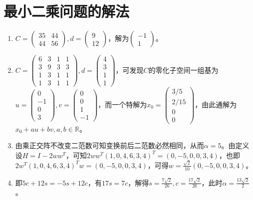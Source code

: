 \documentclass[a4paper,UTF8,fontset=windows]{ctexart}
\begin{document}
\section{最小二乘问题的解法}
\begin{enumerate}
\item
$C=\begin{pmatrix}35&44\\44&56\end{pmatrix},d=\begin{pmatrix}9\\12\end{pmatrix}$，解为$\begin{pmatrix}-1\\1\end{pmatrix}$。

\item
$C=\begin{pmatrix}6&3&1&1\\3&9&3&3\\1&3&1&1\\1&3&1&1\end{pmatrix},d=\begin{pmatrix}4\\3\\1\\1\end{pmatrix}$，可发现$C$的零化子空间一组基为$u=\begin{pmatrix}0\\-1\\0\\3\end{pmatrix},v=\begin{pmatrix}0\\0\\1\\-1\end{pmatrix}$，而一个特解为$x_0=\begin{pmatrix}3/5\\2/15\\0\\0\end{pmatrix}$，由此通解为$x_0+au+bv,a,b\in\mathbb{R}$。

\item
由乘正交阵不改变二范数可知变换前后二范数必然相同，从而$\alpha=5$。由定义设$H=I-2ww^T$，可知$2ww^T(1,0,4,6,3,4)^T=(0,-5,0,0,3,4)$，也即$2w^T(1,0,4,6,3,4)^Tw=(0,-5,0,0,3,4)$，可得$w=\frac{\sqrt2}{10}(0,-5,0,0,3,4)$。

\item
即$5c+12s=-5s+12c$，有$17s=7c$，解得$s=\frac{7\sqrt2}{26},c=\frac{17\sqrt2}{26}$，此时$\alpha=\frac{13\sqrt2}{2}$。


\end{enumerate}
\end{document}
